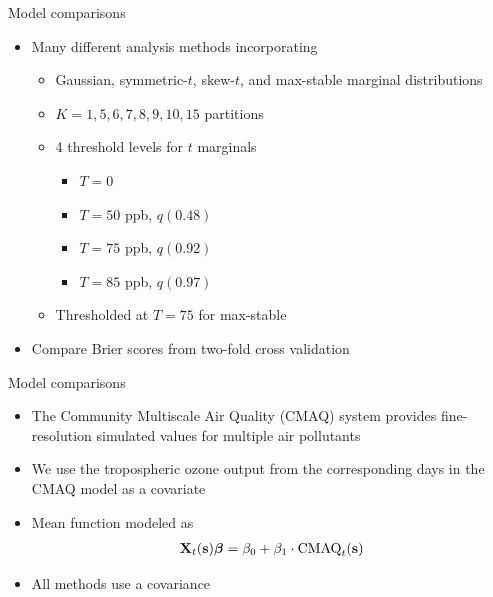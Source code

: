 \documentclass{beamer}
\begin{document}

\begin{frame}{Model comparisons}
  \begin{itemize} \setlength{\itemsep}{1em}
    \item Many different analysis methods incorporating \vspace{0.5em}
    \begin{itemize} \setlength{\itemsep}{0.5em}
      \item Gaussian, symmetric-$t$, skew-$t$, and max-stable marginal distributions
      \item $K=1, 5, 6, 7, 8, 9, 10, 15$ partitions
      \item 4 threshold levels for $t$ marginals \vspace{0.25em}
      \begin{itemize} \setlength{\itemsep}{0.25em}
         \item $T = 0$
         \item $T = 50$ ppb, $q(0.48)$
         \item $T = 75$ ppb, $q(0.92)$
         \item $T = 85$ ppb, $q(0.97)$
      \end{itemize}
      \item Thresholded at $T = 75$ for max-stable
    \end{itemize}
    \item Compare Brier scores from two-fold cross validation
  \end{itemize}
\end{frame}

\begin{frame}{Model comparisons}
  \begin{itemize} \setlength{\itemsep}{1em}
    \item The Community Multiscale Air Quality (CMAQ) system provides fine-resolution simulated values for multiple air pollutants
    \item We use the tropospheric ozone output from the corresponding days in the CMAQ model as a covariate
    \item Mean function modeled as
    \begin{align*}
    	\mbox{\bf X}_t(\mbox{\bf s}) \mbox{\boldmath $\beta$} = \beta_0 + \beta_1 \cdot \text{CMAQ}_t (\mbox{\bf s})
    \end{align*}
    \item All methods use a \Matern covariance
   \end{itemize}
\end{frame}
\end{document}
